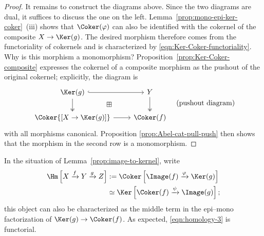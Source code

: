 \begin{proof}
	It remains to construct the diagrams above. Since the two diagrams are
	dual, it suffices to discuss the one on the left.
	Lemma~\ref{prop:mono-epi-ker-coker}~(iii) shows that
	$\Coker(\varphi)$ can also be identified with the cokernel of the composite
	$X\to\Ker(g)$. The desired morphism therefore comes from the functoriality
	of cokernels and is characterized by
	\eqref{eqn:Ker-Coker-functoriality}. Why is this morphism a monomorphism?
	Proposition~\ref{prop:Ker-Coker-composite} expresses the cokernel of a
	composite morphism as the pushout of the original cokernel; explicitly, the
	diagram is
	\[\begin{tikzcd}
		\Ker(g) \arrow[hookrightarrow, r] \arrow[twoheadrightarrow, d] & Y \arrow[twoheadrightarrow, d] \\
		\Coker{[X \to \Ker(g)]} \arrow[r] & \Coker(f) \arrow[phantom, lu, "\boxplus" description]
	\end{tikzcd} \quad \text{(pushout diagram)}\]
	with all morphisms canonical. Proposition
	\ref{prop:Abel-cat-pull-push} then shows that the morphism in the second row
	is a monomorphism.
\end{proof}

In the situation of Lemma~\ref{prop:image-to-kernel}, write
\begin{equation}\label{eqn:homology-3}\begin{aligned}
	\Hm\left[ X \xrightarrow{f} Y \xrightarrow{g} Z \right] & := \Coker\left[ \Image(f) \xrightarrow{\varphi} \Ker(g) \right] \\
	& \simeq \Ker\left[ \Coker(f) \xrightarrow{\psi} \Image(g) \right] ;
\end{aligned}\end{equation}
this object can also be characterized as the middle term in the epi--mono
factorization of $\Ker(g)\to\Coker(f)$. As expected,
\eqref{eqn:homology-3} is functorial.

